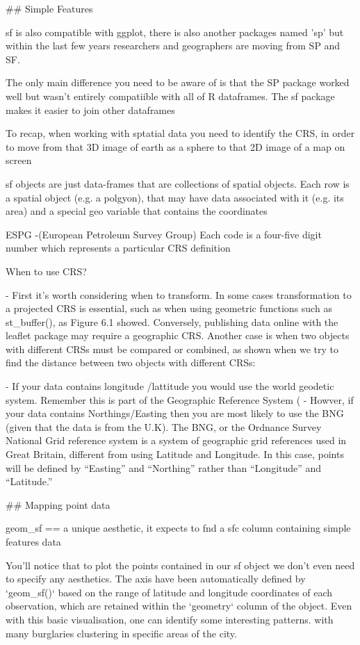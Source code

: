 \documentclass[12pt]{article}
\begin{document}
## Simple Features 


sf is also compatible with ggplot, there is also another packages named 'sp' but within the last few years researchers and geographers are moving from SP and SF. 

The only main difference you need to be aware of is that the SP package worked well but wasn't entirely compatiible with all of R dataframes. The sf package makes it easier to join other dataframes


To recap, when working with sptatial data you need to identify the CRS, in order to move from that 3D image of earth as a sphere to that 2D image of a map on screen

sf objects are just data-frames that are collections of spatial objects. Each row is a spatial object (e.g. a polgyon), that may have data associated with it (e.g. its area) and a special geo variable that contains the coordinates


ESPG -(European Petroleum Survey Group) Each code is a four-five digit number which represents a particular CRS definition


When to use CRS?

- First it’s worth considering when to transform. In some cases transformation to a projected CRS is essential, such as when using geometric functions such as st_buffer(), as Figure 6.1 showed. Conversely, publishing data online with the leaflet package may require a geographic CRS. Another case is when two objects with different CRSs must be compared or combined, as shown when we try to find the distance between two objects with different CRSs:


- If your data contains longitude /lattitude you would use the world geodetic system. Remember this is part of the Geographic Reference System (
- Howver, if your data contains Northings/Easting then you are most likely to use the BNG (given that the data is from the U.K). The BNG, or the Ordnance Survey National Grid reference system is a system of geographic grid references used in Great Britain, different from using Latitude and Longitude. In this case, points will be defined by “Easting” and “Northing” rather than “Longitude” and “Latitude.” 





## Mapping point data 

geom_sf ==  a unique aesthetic, it expects to fnd a sfc column containing simple features data

You'll notice that to plot the points contained in our sf object we don't even need to specify any aesthetics. The axis have been automatically defined by `geom_sf()` based on the range of latitude and longitude coordinates of each observation, which are retained within the `geometry` column of the object. Even with this basic visualisation, one can identify some interesting patterns. with many burglaries clustering in specific areas of the city.
\end{document}
